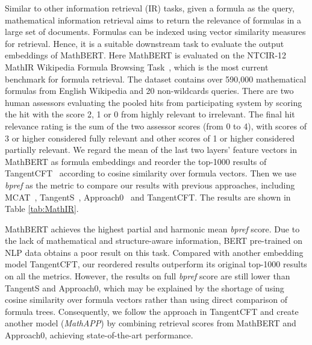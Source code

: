 \documentclass{article}
\begin{document}
Similar to other information retrieval (IR) tasks, given a formula as the query, mathematical information retrieval aims to return the relevance of formulas in a large set of documents. Formulas can be indexed using vector similarity measures for retrieval. Hence, it is a suitable downstream task to evaluate the output embeddings of MathBERT. 
Here MathBERT is evaluated on the NTCIR-12 MathIR Wikipedia Formula Browsing Task~\cite{NTCIR-12}, which is the most current benchmark for formula retrieval. The dataset contains over 590,000 mathematical formulas from English Wikipedia and 20 non-wildcards queries. There are two human assessors evaluating the pooled hits from participating system by scoring the hit with the score 2, 1 or 0 from highly relevant to irrelevant. The final hit relevance rating is the sum of the two assessor scores (from 0 to 4), with scores of 3 or higher considered fully relevant and other scores of 1 or higher considered partially relevant. We regard the mean of the last two layers’ feature vectors in MathBERT as formula embeddings and reorder the top-1000 results of TangentCFT~\cite{TangentCFT} according to cosine similarity over formula vectors. Then we use \textit{bpref} as the metric to compare our results with previous approaches, including MCAT~\cite{MCAT}, TangentS~\cite{TangentS}, Approach0~\cite{Approach0} and TangentCFT. The results are shown in Table \ref{tab:MathIR}.

MathBERT achieves the highest partial and harmonic mean \textit{bpref} score. Due to the lack of mathematical and structure-aware information, BERT pre-trained on NLP data obtains a poor result on this task. Compared with another embedding model TangentCFT, our reordered results outperform its original top-1000 results on all the metrics. However, the results on full \textit{bpref} score are still lower than TangentS and Approach0, which may be explained by the shortage of using cosine similarity over formula vectors rather than using direct comparison of formula trees. Consequently, we follow the approach in TangentCFT and create another model (\textit{MathAPP}) by combining retrieval scores from MathBERT and Approach0, achieving state-of-the-art performance.
\end{document}
